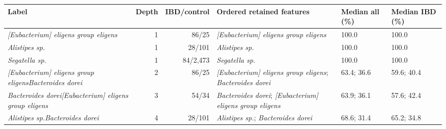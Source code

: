 \begin{center}
\scriptsize
\begin{tabularx}{\textwidth}{@{} Y r r Y Y Y @{}}
\toprule
Label & Depth & IBD/control & Ordered retained features & Median all (\%) & Median IBD (\%)
 \\
\midrule
\emph{[Eubacterium] eligens group eligens} & 1 & 86/25 & \emph{[Eubacterium] eligens group eligens} & 100.0 & 100.0 \\
\emph{Alistipes sp.} & 1 & 28/101 & \emph{Alistipes sp.} & 100.0 & 100.0 \\
\emph{Segatella sp.} & 1 & 84/2,473 & \emph{Segatella sp.} & 100.0 & 100.0 \\
\emph{[Eubacterium] eligens group eligens}\dcstsep \emph{Bacteroides dorei} & 2 & 86/25 & \emph{[Eubacterium] eligens group eligens}; \emph{Bacteroides dorei} & 63.4; 36.6 & 59.6; 40.4 \\
\emph{Bacteroides dorei}\dcstsep \emph{[Eubacterium] eligens group eligens} & 3 & 54/34 & \emph{Bacteroides dorei}; \emph{[Eubacterium] eligens group eligens} & 63.9; 36.1 & 57.6; 42.4 \\
\emph{Alistipes sp.}\dcstsep \emph{Bacteroides dorei} & 4 & 28/101 & \emph{Alistipes sp.}; \emph{Bacteroides dorei} & 68.6; 31.4 & 65.2; 34.8 \\
\bottomrule
\end{tabularx}
\end{center}
